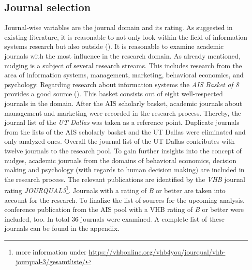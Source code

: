 \subsection{Journal selection}
Journal-wise variables are the journal domain and its rating. As suggested in existing literature, it is reasonable to not only look within the field of information systems research but also outside (\cite{webster_analyzing_2002}). It is reasonable to examine academic journals with the most influence in the research domain. As already mentioned, nudging is a subject of several research streams. This includes research from the area of information systems, management, marketing, behavioral economics, and psychology. Regarding research about information systems the \textit{AIS Basket of 8} provides a good source (\cite{alavi_review_1992}). This basket consists out of eight well-respected journals in the domain. After the AIS scholarly basket, academic journals about management and marketing were recorded in the research process. Thereby, the journal list of the \textit{UT Dallas} was taken as a reference point. Duplicate journals from the lists of the AIS scholarly basket and the UT Dallas were eliminated and only analyzed ones. Overall the journal list of the UT Dallas contributes with twelve journals to the research pool. To gain further insights into the concept of nudges, academic journals from the domains of behavioral economics, decision making and psychology (with regards to human decision making) are included in the research process. The relevant publications are identified by the \textit{VHB} journal rating \textit{JOURQUAL3}\footnote{more information under \url{https://vhbonline.org/vhb4you/jourqual/vhb-jourqual-3/gesamtliste/}}. Journals with a rating of \textit{B} or better are taken into account for the research. To finalize the list of sources for the upcoming analysis, conference publication from the AIS pool with a VHB rating of \textit{B} or better were included, too. In total 36 journals were examined. A complete list of these journals can be found in the appendix. %

